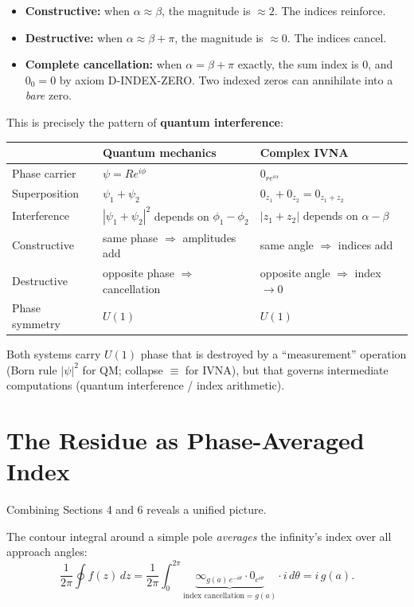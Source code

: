 \documentclass[11pt,a4paper]{article}
\newcommand{\vi}[1]{0_{#1}}          %
\newcommand{\vinf}[1]{\infty_{#1}}   %
\newcommand{\collapse}{\mathrel{\equiv}}
\begin{document}
\begin{itemize}[nosep]
  \item \textbf{Constructive:} when $\alpha \approx \beta$, the magnitude is $\approx 2$. The indices reinforce.
  \item \textbf{Destructive:} when $\alpha \approx \beta + \pi$, the magnitude is $\approx 0$. The indices cancel.
  \item \textbf{Complete cancellation:} when $\alpha = \beta + \pi$ exactly, the sum index is $0$, and $\vi{0} = 0$ by axiom D-INDEX-ZERO. Two indexed zeros can annihilate into a \emph{bare} zero.
\end{itemize}

This is precisely the pattern of \textbf{quantum interference}:
\begin{center}
\renewcommand{\arraystretch}{1.4}
\begin{tabular}{lll}
& \textbf{Quantum mechanics} & \textbf{Complex IVNA} \\
\hline
Phase carrier & $\psi = Re^{i\phi}$ & $\vi{re^{i\alpha}}$ \\
Superposition & $\psi_1 + \psi_2$ & $\vi{z_1} + \vi{z_2} = \vi{z_1 + z_2}$ \\
Interference & $|\psi_1 + \psi_2|^2$ depends on $\phi_1 - \phi_2$ & $|z_1 + z_2|$ depends on $\alpha - \beta$ \\
Constructive & same phase $\Rightarrow$ amplitudes add & same angle $\Rightarrow$ indices add \\
Destructive & opposite phase $\Rightarrow$ cancellation & opposite angle $\Rightarrow$ index $\to 0$ \\
Phase symmetry & $U(1)$ & $U(1)$ \\
\end{tabular}
\end{center}

Both systems carry $U(1)$ phase that is destroyed by a ``measurement'' operation (Born rule $|\psi|^2$ for QM; collapse $\collapse$ for IVNA), but that governs intermediate computations (quantum interference / index arithmetic).

\section{The Residue as Phase-Averaged Index}

Combining Sections 4 and 6 reveals a unified picture.

The contour integral around a simple pole \emph{averages} the infinity's index over all approach angles:
\[
  \frac{1}{2\pi}\oint f(z)\,dz
  = \frac{1}{2\pi}\int_0^{2\pi} \underbrace{\vinf{g(a)\,e^{-i\theta}} \cdot \vi{e^{i\theta}}}_{\text{index cancellation} = g(a)} \cdot i\,d\theta
  = i\,g(a).
\]
\end{document}
